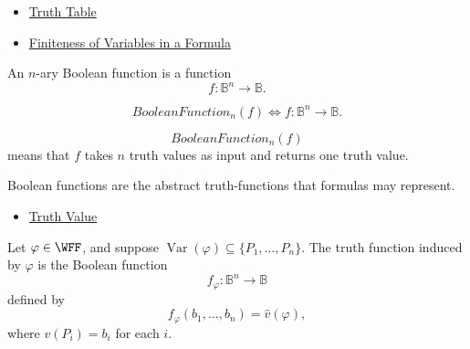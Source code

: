 \begin{dependencies}
\begin{itemize}
  \item \hyperref[def:truth-table-propositional-logic]{Truth Table}
  \item \hyperref[lem:finiteness-of-variables-propositional-formulas]{Finiteness of Variables in a Formula}
\end{itemize}
\end{dependencies}
\begin{tcolorbox}[colback=propbox, colframe=propborder, arc=2pt,
  left=6pt, right=6pt, top=4pt, bottom=4pt,
  title={\small\textbf{Definition (Boolean Function)}},
  fonttitle=\small\bfseries]
\begin{definition}
\label{def:boolean-function-propositional-logic}
An \(n\)-ary Boolean function is a function
\[
f:\mathbb{B}^n\to\mathbb{B}.
\]
\end{definition}
\end{tcolorbox}

\begin{remark*}
\[
BooleanFunction_n(f)
\Longleftrightarrow
f:\mathbb{B}^n\to\mathbb{B}.
\]
\end{remark*}

\begin{remark*}
\[
BooleanFunction_n(f)
\]
means that \(f\) takes \(n\) truth values as input and returns one truth value.
\end{remark*}

\begin{remark*}[Interpretation]
Boolean functions are the abstract truth-functions that formulas may represent.
\end{remark*}

\begin{dependencies}
\begin{itemize}
  \item \hyperref[def:truth-value-propositional-logic]{Truth Value}
\end{itemize}
\end{dependencies}
\begin{tcolorbox}[colback=propbox, colframe=propborder, arc=2pt,
  left=6pt, right=6pt, top=4pt, bottom=4pt,
  title={\small\textbf{Definition (Truth Function Induced by a Formula)}},
  fonttitle=\small\bfseries]
\begin{definition}
\label{def:truth-function-induced-by-formula}
Let \(\varphi\in\WFF\), and suppose \(\operatorname{Var}(\varphi)\subseteq\{P_1,\ldots,P_n\}\). The truth function induced by \(\varphi\) is the Boolean function
\[
f_\varphi:\mathbb{B}^n\to\mathbb{B}
\]
defined by
\[
f_\varphi(b_1,\ldots,b_n)=\widehat v(\varphi),
\]
where \(v(P_i)=b_i\) for each \(i\).
\end{definition}
\end{tcolorbox}

